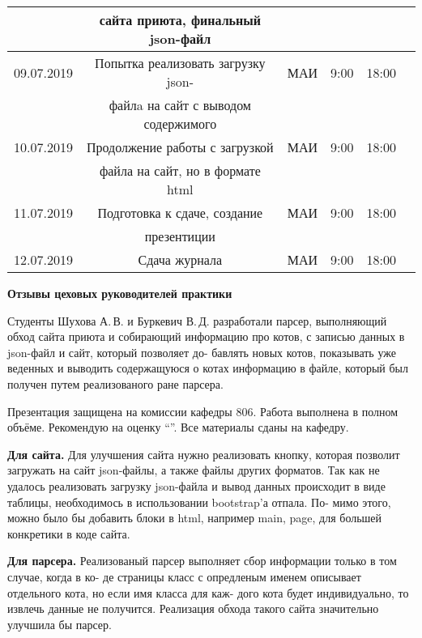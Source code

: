 \documentclass[dvipsnames,pdf, unicode, 12pt, a4paper, oneside, fleqn]{article}
\begin{document}
\begin{tabular}{|c|c|c|c|c|c|}
& сайта приюта, финальный json-файл & & & & \\
\hline
09.07.2019 & Попытка реализовать загрузку json- & МАИ & 9:00 & 18:00 & \\
& файлa на сайт с выводом содержимого & & & & \\
\hline
10.07.2019 & Продолжение работы с загрузкой & МАИ & 9:00 & 18:00 & \\
& файла на сайт, но в формате html & & & & \\
\hline
11.07.2019 & Подготовка к сдаче, создание & МАИ & 9:00 & 18:00 & \\
& презентиции & & & & \\
\hline
12.07.2019 & Сдача журнала & МАИ & 9:00 & 18:00 &  \\
\hline
\end{tabular}

\pagebreak

{\small}
%
%
\begin{center}
\bfseries{\large Отзывы цеховых руководителей практики}
\end{center}

\begin{flushleft}
Студенты Шухова А.\,В. и Буркевич В.\,Д. разработали парсер, выполняющий обход сайта приюта и собирающий информацию про котов, с записью данных в json-файл и сайт, который позволяет до- бавлять новых котов, показывать уже веденных и выводить содержащуюся о котах информацию в файле, который был получен путем реализованого ране парсера.

Презентация защищена на комиссии кафедры 806. Работа выполнена в полном объёме. Рекомендую на оценку \enquote{\hspace{2cm}}. Все материалы сданы на кафедру.
\end{flushleft}
\pagebreak


\begin{flushleft}
{\bfseries Для сайта.} Для улучшения сайта нужно реализовать кнопку, которая позволит загружать на сайт json-файлы, а также файлы других форматов. Так как не удалось реализовать загрузку json-файла и вывод данных происходит в виде таблицы, необходимось в использовании bootstrap'а отпала. По- мимо этого, можно было бы добавить блоки в html, например main, page, для большей конкретики в коде сайта.

{\bfseries Для парсера.} Реализованый парсер выполняет сбор информации только в том случае, когда в ко- де страницы класс с опредленым именем описывает отдельного кота, но если имя класса для каж- дого кота будет индивидуально, то извлечь данные не получится. Реализация обхода такого сайта значительно улучшила бы парсер.
\end{flushleft}
\pagebreak
\end{document}
